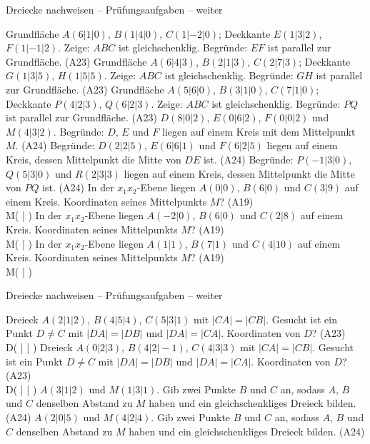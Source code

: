 \begin{aufgabe}{Dreiecke nachweisen – Prüfungsaufgaben – weiter}
\begin{teile}
\teil Grundfläche $A(6 | 1 | 0)$, $B(1 | 4 | 0)$, $C(1 | -2 | 0)$; Deckkante $E(1 | 3 | 2)$, $F(1 | -1 | 2)$. Zeige: $ABC$ ist gleichschenklig. Begründe: $EF$ ist parallel zur Grundfläche. \hfill (A23)
\teil Grundfläche $A(6 | 4 | 3)$, $B(2 | 1 | 3)$, $C(2 | 7 | 3)$; Deckkante $G(1 | 3 | 5)$, $H(1 | 5 | 5)$. Zeige: $ABC$ ist gleichschenklig. Begründe: $GH$ ist parallel zur Grundfläche. \hfill (A23)
\teil Grundfläche $A(5 | 6 | 0)$, $B(3 | 1 | 0)$, $C(7 | 1 | 0)$; Deckkante $P(4 | 2 | 3)$, $Q(6 | 2 | 3)$. Zeige: $ABC$ ist gleichschenklig. Begründe: $PQ$ ist parallel zur Grundfläche. \hfill (A23)
\teil $D(8 | 0 | 2)$, $E(0 | 6 | 2)$, $F(0 | 0 | 2)$ und $M(4 | 3 | 2)$. Begründe: $D$, $E$ und $F$ liegen auf einem Kreis mit dem Mittelpunkt $M$. \hfill (A24)
\teil Begründe: $D(2 | 2 | 5)$, $E(6 | 6 | 1)$ und $F(6 | 2 | 5)$ liegen auf einem Kreis, dessen Mittelpunkt die Mitte von $DE$ ist. \hfill (A24)
\teil Begründe: $P(-1 | 3 | 0)$, $Q(5 | 3 | 0)$ und $R(2 | 3 | 3)$ liegen auf einem Kreis, dessen Mittelpunkt die Mitte von $PQ$ ist. \hfill (A24)
\teil In der $x_1x_2$-Ebene liegen $A(0 | 0)$, $B(6 | 0)$ und $C(3 | 9)$ auf einem Kreis. Koordinaten seines Mittelpunkts $M$? \hfill (A19) \\ M( \leerfeld | \leerfeld )
\teil In der $x_1x_2$-Ebene liegen $A(-2 | 0)$, $B(6 | 0)$ und $C(2 | 8)$ auf einem Kreis. Koordinaten seines Mittelpunkts $M$? \hfill (A19) \\ M( \leerfeld | \leerfeld )
\teil In der $x_1x_2$-Ebene liegen $A(1 | 1)$, $B(7 | 1)$ und $C(4 | 10)$ auf einem Kreis. Koordinaten seines Mittelpunkts $M$? \hfill (A19) \\ M( \leerfeld | \leerfeld )
\end{teile}
\end{aufgabe}

\begin{aufgabe}{Dreiecke nachweisen – Prüfungsaufgaben – weiter}
\begin{teile}
\teil Dreieck $A(2 | 1 | 2)$, $B(4 | 5 | 4)$, $C(5 | 3 | 1)$ mit $|CA| = |CB|$. Gesucht ist ein Punkt $D \ne C$ mit $|DA| = |DB|$ und $|DA| = |CA|$. Koordinaten von $D$? \hfill (A23) \\ D( \leerfeld | \leerfeld | \leerfeld )
\teil Dreieck $A(0 | 2 | 3)$, $B(4 | 2 | -1)$, $C(4 | 3 | 3)$ mit $|CA| = |CB|$. Gesucht ist ein Punkt $D \ne C$ mit $|DA| = |DB|$ und $|DA| = |CA|$. Koordinaten von $D$? \hfill (A23) \\ D( \leerfeld | \leerfeld | \leerfeld )
\teil $A(3 | 1 | 2)$ und $M(1 | 3 | 1)$. Gib zwei Punkte $B$ und $C$ an, sodass $A$, $B$ und $C$ denselben Abstand zu $M$ haben und ein gleichschenkliges Dreieck bilden. \hfill (A24)
\teil $A(2 | 0 | 5)$ und $M(4 | 2 | 4)$. Gib zwei Punkte $B$ und $C$ an, sodass $A$, $B$ und $C$ denselben Abstand zu $M$ haben und ein gleichschenkliges Dreieck bilden. \hfill (A24)
\end{teile}
\end{aufgabe}

